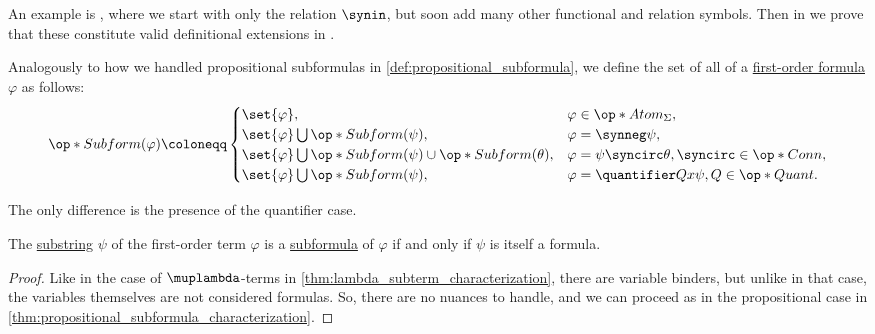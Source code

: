 \begin{remark}
\begin{thmenum}
    An example is , where we start with only the relation \( {\synin} \), but soon add many other functional and relation symbols. Then in  we prove that these constitute valid definitional extensions in .
  \end{thmenum}
\end{remark}

\begin{definition}\label{def:fol_subformula}\mimprovised
  Analogously to how we handled propositional subformulas in \cref{def:propositional_subformula}, we define the set of all  of a \hyperref[def:fol_formula]{first-order formula} \( \varphi \) as follows:
  \begin{equation*}
    \op*{Subform}(\varphi) \coloneqq \begin{cases}
      \set{ \varphi },                                                        &\varphi \in \op*{Atom}_\Sigma, \\
      \set{ \varphi } \bigcup \op*{Subform}(\psi),                            &\varphi = \synneg \psi, \\
      \set{ \varphi } \bigcup \op*{Subform}(\psi) \cup \op*{Subform}(\theta), &\varphi = \psi \syncirc \theta, {\syncirc} \in \op*{Conn}, \\
      \set{ \varphi } \bigcup \op*{Subform}(\psi),                            &\varphi = \quantifier Q x \psi, Q \in \op*{Quant.}
    \end{cases}
  \end{equation*}

  The only difference is the presence of the quantifier case.
\end{definition}

\begin{proposition}\label{thm:fol_subformula_characterization}
  The \hyperref[def:formal_language/substring]{substring} \( \psi \) of the first-order term \( \varphi \) is a \hyperref[def:fol_subformula]{subformula} of \( \varphi \) if and only if \( \psi \) is itself a formula.
\end{proposition}
\begin{proof}
  Like in the case of \( \muplambda \)-terms in \cref{thm:lambda_subterm_characterization}, there are variable binders, but unlike in that case, the variables themselves are not considered formulas. So, there are no nuances to handle, and we can proceed as in the propositional case in \cref{thm:propositional_subformula_characterization}.
\end{proof}

